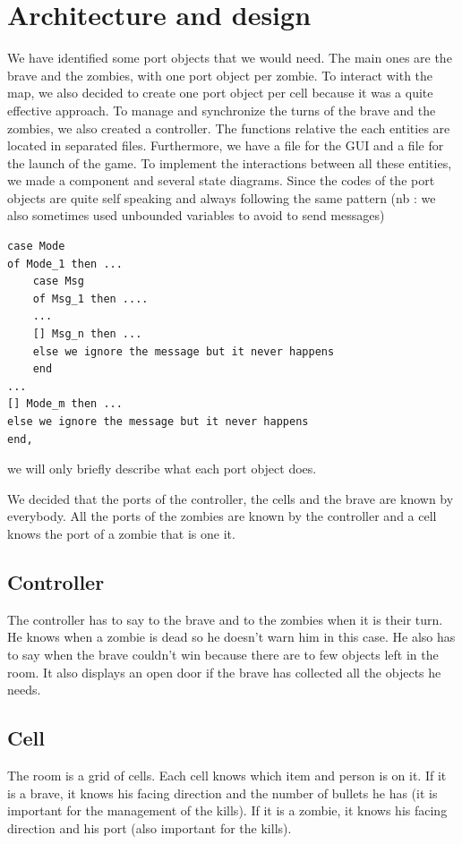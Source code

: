 \documentclass[11pt,a4paper]{article}
\begin{document}
\section{Architecture and design}

We have identified some port objects that we would need. The main ones are the brave and the zombies, with one port object per zombie. To interact with the map, we also decided to create one port object per cell because it was a quite effective approach. To manage and synchronize the turns of the brave and the zombies, we also created a controller. The functions relative the each entities are located in separated files. Furthermore, we have a file for the GUI and a file for the launch of the game. To implement the interactions between all these entities, we made a component and several state diagrams. Since the codes of the port objects are quite self speaking and always following the same pattern (nb : we also sometimes used unbounded variables to avoid to send messages)
\begin{lstlisting}[basicstyle=\ttfamily\footnotesize]
case Mode
of Mode_1 then ...
	case Msg
	of Msg_1 then ....
	...
	[] Msg_n then ...
	else we ignore the message but it never happens
	end
...	
[] Mode_m then ...
else we ignore the message but it never happens
end,
\end{lstlisting}
we will only briefly describe what each port object does. 
	
We decided that the ports of the controller, the cells and the brave are known by everybody. All the ports of the zombies are known by the controller and a cell knows the port of a zombie that is one it.

\subsection{Controller}
The controller has to say to the brave and to the zombies when it is their turn. He knows when a zombie is dead so he doesn't warn him in this case.  He also has to say when the brave couldn't win because there are to few objects left in the room. It also displays an open door if the brave has collected all the objects he needs.

\subsection{Cell}
The room is a grid of cells. Each cell knows which item and person is on it. If it is a brave, it knows his facing direction and the number of bullets he has (it is important for the management of the kills). If it is a zombie, it knows his facing direction and his port (also important for the kills).
\end{document}
